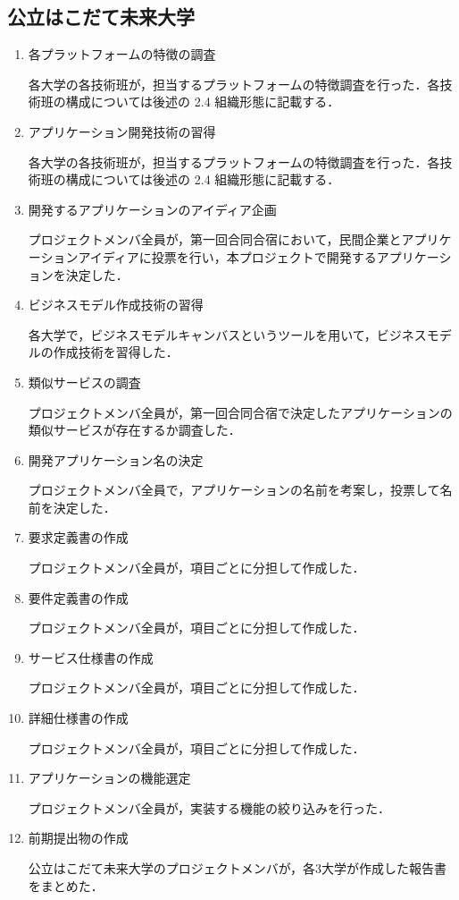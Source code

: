\subsection{公立はこだて未来大学}
\begin{enumerate}
\item 各プラットフォームの特徴の調査
\par 各大学の各技術班が，担当するプラットフォームの特徴調査を行った．各技術班の構成については後述の 2.4 組織形態に記載する．
\item アプリケーション開発技術の習得 
\par 各大学の各技術班が，担当するプラットフォームの特徴調査を行った．各技術班の構成については後述の 2.4 組織形態に記載する．
\item 開発するアプリケーションのアイディア企画
\par プロジェクトメンバ全員が，第一回合同合宿において，民間企業とアプリケーションアイディアに投票を行い，本プロジェクトで開発するアプリケーションを決定した．
\item ビジネスモデル作成技術の習得
\par 各大学で，ビジネスモデルキャンバスというツールを用いて，ビジネスモデルの作成技術を習得した．
\item 類似サービスの調査
\par プロジェクトメンバ全員が，第一回合同合宿で決定したアプリケーションの類似サービスが存在するか調査した．
\item 開発アプリケーション名の決定
\par プロジェクトメンバ全員で，アプリケーションの名前を考案し，投票して名前を決定した．
\item 要求定義書の作成
\par プロジェクトメンバ全員が，項目ごとに分担して作成した．
\item 要件定義書の作成
\par プロジェクトメンバ全員が，項目ごとに分担して作成した．
\item サービス仕様書の作成
\par プロジェクトメンバ全員が，項目ごとに分担して作成した．
\item 詳細仕様書の作成
\par プロジェクトメンバ全員が，項目ごとに分担して作成した．
\item アプリケーションの機能選定
\par プロジェクトメンバ全員が，実装する機能の絞り込みを行った．
\item  前期提出物の作成
\par 公立はこだて未来大学のプロジェクトメンバが，各3大学が作成した報告書をまとめた．
\end{enumerate}

